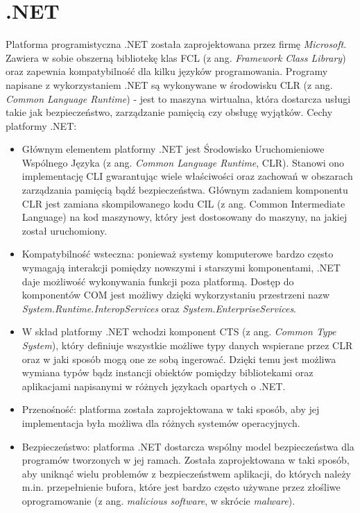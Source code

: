 \section{.NET}
Platforma programistyczna .NET została zaprojektowana przez firmę \textit{Microsoft}. Zawiera w sobie obszerną bibliotekę klas FCL (z ang. \textit{Framework Class Library}) oraz zapewnia kompatybilność dla kilku języków programowania. Programy napisane z wykorzystaniem .NET są wykonywane w środowisku CLR (z ang. \textit{Common Language Runtime}) - jest to maszyna wirtualna, która dostarcza usługi takie jak bezpieczeństwo, zarządzanie pamięcią czy obsługę wyjątków. Cechy platformy .NET:
\begin{itemize}
	\item Głównym elementem platformy .NET jest Środowisko Uruchomieniowe Wspólnego Języka (z ang. \textit{Common Language Runtime}, CLR). Stanowi ono implementację CLI gwarantując wiele właściwości oraz zachowań w obszarach zarządzania pamięcią bądź bezpieczeństwa. Głównym zadaniem komponentu CLR jest zamiana skompilowanego kodu CIL (z ang. Common Intermediate Language) na kod maszynowy, który jest dostosowany do maszyny, na jakiej został uruchomiony.
	\item Kompatybilność wsteczna: ponieważ systemy komputerowe bardzo często wymagają interakcji pomiędzy nowszymi i starszymi komponentami, .NET daje możliwość wykonywania funkcji poza platformą. Dostęp do komponentów COM jest możliwy dzięki wykorzystaniu przestrzeni nazw \textit{System.Runtime.InteropServices} oraz \textit{System.EnterpriseServices}.
	\item W skład platformy .NET wchodzi komponent CTS (z ang. \textit{Common Type System}), który definiuje wszystkie możliwe typy danych wspierane przez CLR oraz w jaki sposób mogą one ze sobą ingerować. Dzięki temu jest możliwa wymiana typów bądz instancji obiektów pomiędzy bibliotekami oraz aplikacjami napisanymi w różnych językach opartych o .NET.
	\item Przenośność: platforma została zaprojektowana w taki sposób, aby jej implementacja była możliwa dla różnych systemów operacyjnych.
	\item Bezpieczeństwo: platforma .NET dostarcza wspólny model bezpieczeństwa dla programów tworzonych w jej ramach. Została zaprojektowana w taki sposób, aby uniknąć wielu problemów z bezpieczeństwem aplikacji, do których należy m.in. przepełnienie bufora, które jest bardzo często używane przez złośliwe oprogramowanie (z ang. \textit{malicious software}, w skrócie \textit{malware}).
	
\end{itemize}


